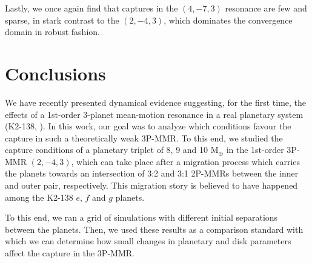 \documentclass[baaa]{baaa}
\begin{document}
Lastly, we once again find that captures in the $(4,-7,3)$ resonance are few and sparse, in stark contrast to the $(2,-4,3)$, which dominates the convergence domain in robust fashion.



\section{Conclusions}

We have recently presented dynamical evidence suggesting, for the first time, the effects of a 1st-order 3-planet mean-motion resonance in a real planetary system (K2-138, \citealp{cerioni.beauge.2023}).
In this work, our goal was to analyze which conditions favour the capture in such a theoretically weak 3P-MMR.
To this end, we studied the capture conditions of a planetary triplet of 8, 9 and 10 $\mathrm{M_\oplus}$ in the 1st-order 3P-MMR $(2,-4,3)$, which can take place after a migration process which carries the planets towards an intersection of 3:2 and 3:1 2P-MMRs between the inner and outer pair, respectively.
This migration story is believed to have happened among the K2-138 $e$, $f$ and $g$ planets.


To this end, we ran a grid of simulations with different initial separations between the planets.
Then, we used these results as a comparison standard with which we can determine how small changes in planetary and disk parameters affect the capture in the 3P-MMR.

\end{document}
